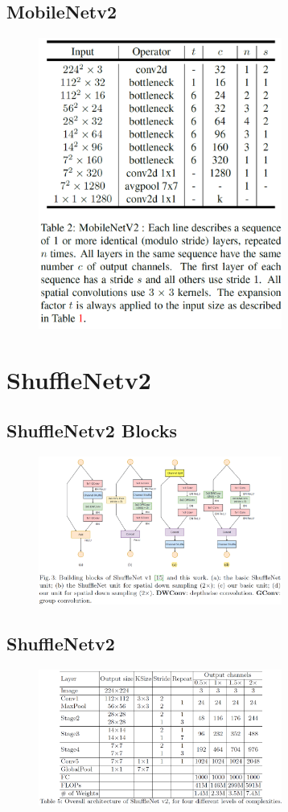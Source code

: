 \subsection{MobileNetv2}
\begin{figure}[H]
    \centering
    \includegraphics[width=8cm]{images/models/mobilenetv2.png}
    \label{fig:mobilenetv2}
\end{figure}

\section{ShuffleNetv2}
\subsection{ShuffleNetv2 Blocks}
\begin{figure}[H]
    \centering
    \includegraphics[width=8cm]{images/models/shufflenetv2_block.png}
    \label{fig:shufflenetv2_block}
\end{figure}

\subsection{ShuffleNetv2}
\begin{figure}[H]
    \centering
    \includegraphics[width=8cm]{images/models/shufflenetv2.png}
    \label{fig:shufflenetv2}
\end{figure}

